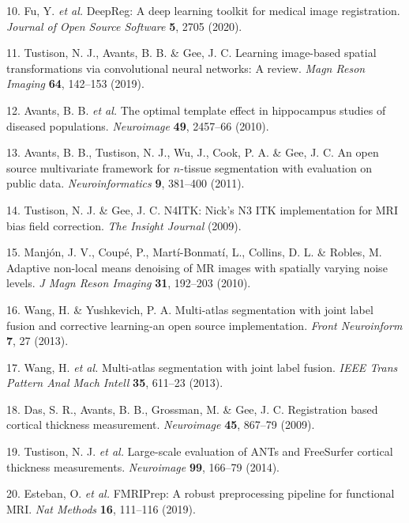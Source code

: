 \documentclass[12pt,]{article}
\begin{document}
\leavevmode\hypertarget{ref-Fu:2020aa}{}%
10. Fu, Y. \emph{et al.} DeepReg: A deep learning toolkit for medical
image registration. \emph{Journal of Open Source Software} \textbf{5},
2705 (2020).

\leavevmode\hypertarget{ref-Tustison:2019ab}{}%
11. Tustison, N. J., Avants, B. B. \& Gee, J. C. Learning image-based
spatial transformations via convolutional neural networks: A review.
\emph{Magn Reson Imaging} \textbf{64}, 142--153 (2019).

\leavevmode\hypertarget{ref-Avants:2010aa}{}%
12. Avants, B. B. \emph{et al.} The optimal template effect in
hippocampus studies of diseased populations. \emph{Neuroimage}
\textbf{49}, 2457--66 (2010).

\leavevmode\hypertarget{ref-Avants:2011aa}{}%
13. Avants, B. B., Tustison, N. J., Wu, J., Cook, P. A. \& Gee, J. C. An
open source multivariate framework for \(n\)-tissue segmentation with
evaluation on public data. \emph{Neuroinformatics} \textbf{9}, 381--400
(2011).

\leavevmode\hypertarget{ref-Tustison2009e}{}%
14. Tustison, N. J. \& Gee, J. C. N4ITK: Nick's N3 ITK implementation
for MRI bias field correction. \emph{The Insight Journal} (2009).

\leavevmode\hypertarget{ref-Manjon:2010aa}{}%
15. Manjón, J. V., Coupé, P., Martí-Bonmatí, L., Collins, D. L. \&
Robles, M. Adaptive non-local means denoising of MR images with
spatially varying noise levels. \emph{J Magn Reson Imaging} \textbf{31},
192--203 (2010).

\leavevmode\hypertarget{ref-Wang:2013aa}{}%
16. Wang, H. \& Yushkevich, P. A. Multi-atlas segmentation with joint
label fusion and corrective learning-an open source implementation.
\emph{Front Neuroinform} \textbf{7}, 27 (2013).

\leavevmode\hypertarget{ref-Wang:2013ab}{}%
17. Wang, H. \emph{et al.} Multi-atlas segmentation with joint label
fusion. \emph{IEEE Trans Pattern Anal Mach Intell} \textbf{35}, 611--23
(2013).

\leavevmode\hypertarget{ref-Das:2009aa}{}%
18. Das, S. R., Avants, B. B., Grossman, M. \& Gee, J. C. Registration
based cortical thickness measurement. \emph{Neuroimage} \textbf{45},
867--79 (2009).

\leavevmode\hypertarget{ref-Tustison:2014ab}{}%
19. Tustison, N. J. \emph{et al.} Large-scale evaluation of ANTs and
FreeSurfer cortical thickness measurements. \emph{Neuroimage}
\textbf{99}, 166--79 (2014).

\leavevmode\hypertarget{ref-Esteban:2019aa}{}%
20. Esteban, O. \emph{et al.} FMRIPrep: A robust preprocessing pipeline
for functional MRI. \emph{Nat Methods} \textbf{16}, 111--116 (2019).
\end{document}
